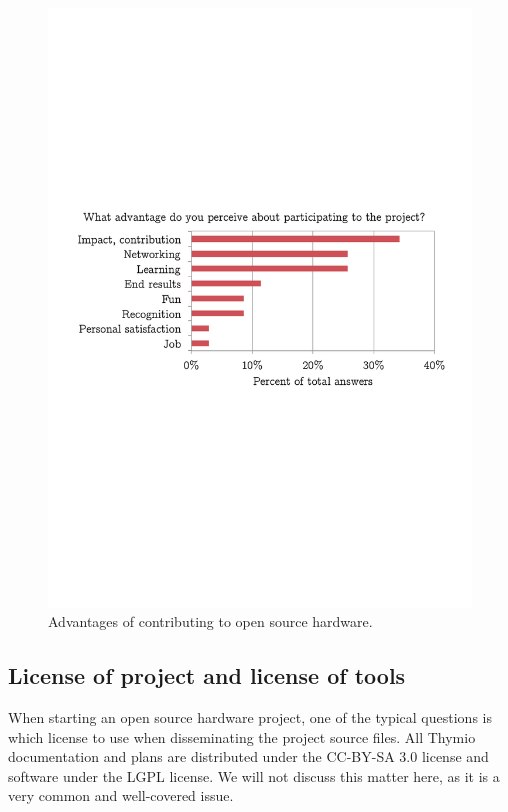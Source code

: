 \documentclass[letterpaper, 10 pt, conference]{ieeeconf}  %
\begin{document}
\begin{figure}
\centering
\includegraphics[width=\columnwidth]{figures/advantages}
\caption{Advantages of contributing to open source hardware.}
\label{fig:getout}
\end{figure}

\subsection{License of project and license of tools}

When starting an open source hardware project, one of the typical questions is which license to use when disseminating the project source files. 
All Thymio documentation and plans are distributed under the CC-BY-SA 3.0 license and software under the LGPL license.
We will not discuss this matter here, as it is a very common and well-covered issue. 
\end{document}
